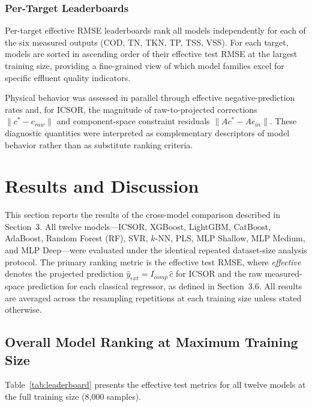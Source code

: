 \documentclass[11pt]{article}
\begin{document}
\subsubsection{Per-Target Leaderboards}

Per-target effective RMSE leaderboards rank all models independently for each of the six measured outputs (COD, TN, TKN, TP, TSS, VSS). For each target, models are sorted in ascending order of their effective test RMSE at the largest training size, providing a fine-grained view of which model families excel for specific effluent quality indicators.

Physical behavior was assessed in parallel through effective negative-prediction rates and, for ICSOR, the magnitude of raw-to-projected corrections $\|c^* - c_{raw}\|$ and component-space constraint residuals $\|Ac^* - Ac_{in}\|$. These diagnostic quantities were interpreted as complementary descriptors of model behavior rather than as substitute ranking criteria.

\section{Results and Discussion}

This section reports the results of the cross-model comparison described in Section~3. All twelve models---ICSOR, XGBoost, LightGBM, CatBoost, AdaBoost, Random Forest (RF), SVR, $k$-NN, PLS, MLP Shallow, MLP Medium, and MLP Deep---were evaluated under the identical repeated dataset-size analysis protocol. The primary ranking metric is the effective test RMSE, where \textit{effective} denotes the projected prediction $\hat{y}_{ext} = I_{comp}\,\hat{c}$ for ICSOR and the raw measured-space prediction for each classical regressor, as defined in Section~3.6. All results are averaged across the resampling repetitions at each training size unless stated otherwise.

\subsection{Overall Model Ranking at Maximum Training Size}

Table~\ref{tab:leaderboard} presents the effective test metrics for all twelve models at the full training size (8{,}000 samples).
\end{document}

